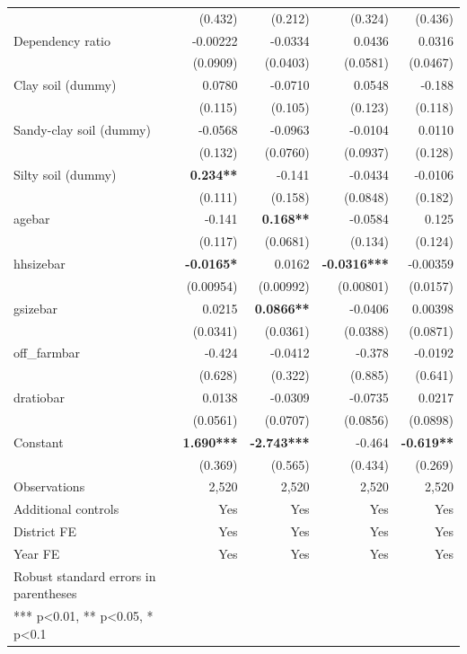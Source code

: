 \documentclass[
]{article}
\begin{document}
\begin{longtable}[t]{lrrrr}
 & (0.432) & (0.212) & (0.324) & (0.436)\\
Dependency ratio & -0.00222 & -0.0334 & 0.0436 & 0.0316\\
 & (0.0909) & (0.0403) & (0.0581) & (0.0467)\\
Clay soil (dummy) & 0.0780 & -0.0710 & 0.0548 & -0.188\\
 & (0.115) & (0.105) & (0.123) & (0.118)\\
Sandy-clay soil (dummy) & -0.0568 & -0.0963 & -0.0104 & 0.0110\\
 & (0.132) & (0.0760) & (0.0937) & (0.128)\\
Silty soil (dummy) & \textbf{0.234**} & -0.141 & -0.0434 & -0.0106\\
 & (0.111) & (0.158) & (0.0848) & (0.182)\\
agebar & -0.141 & \textbf{0.168**} & -0.0584 & 0.125\\
 & (0.117) & (0.0681) & (0.134) & (0.124)\\
hhsizebar & \textbf{-0.0165*} & 0.0162 & \textbf{-0.0316***} & -0.00359\\
 & (0.00954) & (0.00992) & (0.00801) & (0.0157)\\
gsizebar & 0.0215 & \textbf{0.0866**} & -0.0406 & 0.00398\\
 & (0.0341) & (0.0361) & (0.0388) & (0.0871)\\
off\_farmbar & -0.424 & -0.0412 & -0.378 & -0.0192\\
 & (0.628) & (0.322) & (0.885) & (0.641)\\
dratiobar & 0.0138 & -0.0309 & -0.0735 & 0.0217\\
 & (0.0561) & (0.0707) & (0.0856) & (0.0898)\\
Constant & \textbf{1.690***} & \textbf{-2.743***} & -0.464 & \textbf{-0.619**}\\
\midrule
 & (0.369) & (0.565) & (0.434) & (0.269)\\
Observations & 2,520 & 2,520 & 2,520 & 2,520\\
Additional controls & Yes & Yes & Yes & Yes\\
District FE & Yes & Yes & Yes & Yes\\
Year FE & Yes & Yes & Yes & Yes\\
\midrule
Robust standard errors in parentheses &  &  &  & \\
*** p<0.01, ** p<0.05, * p<0.1 &  &  &  & \\*
\end{longtable}
\endgroup{}

\newpage
\end{document}
